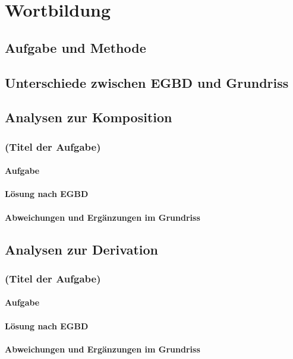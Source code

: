 \chapter{Wortbildung}
\label{sec:wortbildung}

\section{Aufgabe und Methode}
\label{sec:wortbildung:aufgabeundmethoden}

\section{Unterschiede zwischen EGBD und Grundriss}
\label{sec:wortbildung:unterschiedezwischenegbdundgrundriss}

\section{Analysen zur Komposition}
\label{sec:wortbildung:analysenzurkomposition}

\subsection{(Titel der Aufgabe)}

\subsubsection{Aufgabe}

\subsubsection{Lösung nach EGBD}

\subsubsection{Abweichungen und Ergänzungen im Grundriss}


\section{Analysen zur Derivation}
\label{sec:wortbildung:analysenzurderivation}

\subsection{(Titel der Aufgabe)}

\subsubsection{Aufgabe}

\subsubsection{Lösung nach EGBD}

\subsubsection{Abweichungen und Ergänzungen im Grundriss}
